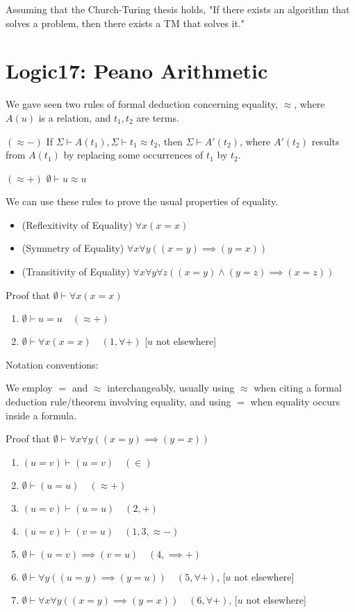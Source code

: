 \documentclass{article}
\begin{document}
Assuming that the Church-Turing thesis holds, "If there exists an algorithm that solves a problem, then there exists a TM that solves it."

\section{Logic17: Peano Arithmetic}

We gave seen two rules of formal deduction concerning equality, $\approx$, where $A(u)$ is a relation, and $t_1, t_2$ are terms.

$(\approx - )$ If $\Sigma \vdash A(t_1), \Sigma \vdash t_1 \approx t_2$, then $\Sigma \vdash A'(t_2)$, where $A'(t_2)$ results from $A(t_1)$ by replacing some occurrences of $t_1$ by $t_2$.

$(\approx +)$ $\emptyset \vdash u \approx u$

We can use these rules to prove the usual properties of equality.
\begin{itemize}
    \item (Reflexitivity of Equality) $\forall x (x = x)$
    \item (Symmetry of Equality) $\forall x \forall y ((x = y) \implies (y = x))$
    \item (Transitivity of Equality) $\forall x \forall y \forall z ((x = y) \wedge (y = z) \implies (x = z))$
\end{itemize}

Proof that $\emptyset \vdash \forall x (x = x)$

\begin{enumerate}
    \item $\emptyset \vdash u = u \quad (\approx +)$
    \item $\emptyset \vdash \forall x (x = x) \quad (1, \forall +)$ [$u$ not elsewhere]
\end{enumerate}

Notation conventions:

We employ $=$ and $\approx$ interchangeably, usually using $\approx$ when citing a formal deduction rule/theorem involving equality, and using $=$ when equality occurs inside a formula.

Proof that $\emptyset \vdash \forall x \forall y ((x = y) \implies (y = x))$
\begin{enumerate}
    \item $(u = v) \vdash (u = v) \quad (\in)$
    \item $\emptyset \vdash (u=u) \quad (\approx +)$
    \item $(u = v) \vdash (u = u) \quad (2, +)$
    \item $(u = v) \vdash (v = u) \quad (1,3,\approx - )$
    \item $\emptyset \vdash (u = v) \implies (v = u) \quad (4, \implies +)$
    \item $\emptyset \vdash \forall y((u=y) \implies (y = u)) \quad (5, \forall +)$, [$u$ not elsewhere]
    \item $\emptyset \vdash \forall x \forall y((x = y) \implies (y = x)) \quad (6, \forall +)$, [$u$ not elsewhere]
\end{enumerate}
\end{document}
